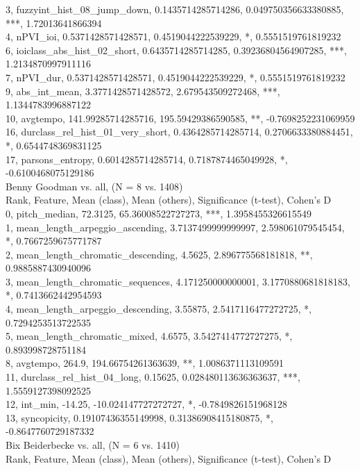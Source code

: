 3, fuzzyint_hist_08_jump_down, 0.1435714285714286, 0.049750356633380885, ***, 1.72013641866394\\
4, nPVI_ioi, 0.5371428571428571, 0.4519044222539229, *, 0.5551519761819232\\
6, ioiclass_abs_hist_02_short, 0.6435714285714285, 0.39236804564907285, ***, 1.2134870997911116\\
7, nPVI_dur, 0.5371428571428571, 0.4519044222539229, *, 0.5551519761819232\\
9, abs_int_mean, 3.3771428571428572, 2.679543509272468, ***, 1.1344783996887122\\
10, avgtempo, 141.99285714285716, 195.59429386590585, **, -0.7698252231069959\\
16, durclass_rel_hist_01_very_short, 0.4364285714285714, 0.2706633380884451, *, 0.6544748369831125\\
17, parsons_entropy, 0.6014285714285714, 0.7187874465049928, *, -0.6100468075129186\\
Benny Goodman vs. all, (N = 8 vs. 1408)\\
Rank, Feature, Mean (class), Mean (others), Significance (t-test), Cohen's D\\
0, pitch_median, 72.3125, 65.36008522727273, ***, 1.3958455326615549\\
1, mean_length_arpeggio_ascending, 3.7137499999999997, 2.598061079545454, *, 0.7667259675771787\\
2, mean_length_chromatic_descending, 4.5625, 2.896775568181818, **, 0.9885887430940096\\
3, mean_length_chromatic_sequences, 4.171250000000001, 3.1770880681818183, *, 0.7413662442954593\\
4, mean_length_arpeggio_descending, 3.55875, 2.5417116477272725, *, 0.7294253513722535\\
5, mean_length_chromatic_mixed, 4.6575, 3.5427414772727275, *, 0.893998728751184\\
8, avgtempo, 264.9, 194.66754261363639, **, 1.0086371113109591\\
11, durclass_rel_hist_04_long, 0.15625, 0.028480113636363637, ***, 1.5559127398092525\\
12, int_min, -14.25, -10.024147727272727, *, -0.7849826151968128\\
13, syncopicity, 0.19107436355149998, 0.31386908415180875, *, -0.8647760729187332\\
Bix Beiderbecke vs. all, (N = 6 vs. 1410)\\
Rank, Feature, Mean (class), Mean (others), Significance (t-test), Cohen's D\\
